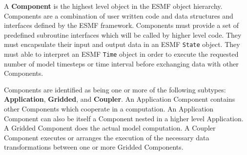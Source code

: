 %


A {\bf Component}
is the highest level object in the ESMF object
hierarchy.  Components are a combination of user written code and
data structures and interfaces defined by the ESMF framework.
Components must provide a set of predefined subroutine interfaces
which will be called by higher level code.  They must encapsulate
their input and output data in an ESMF {\tt State} object.  They
must able to interpret an ESMF {\tt Time} object in order
to execute the requested number of model timesteps or time interval
before exchanging data with other Components.

Components are identified as being one or more of the
following subtypes: {\bf Application}, {\bf Gridded}, and {\bf Coupler}.
An Application Component contains other Components which
cooperate in a computation. An Application Component can also be itself a
Component nested in a higher level Application.  A Gridded Component
does the actual model computation.  A Coupler Component executes or
arranges the execution of the necessary data transformations between one
or more Gridded Components.

